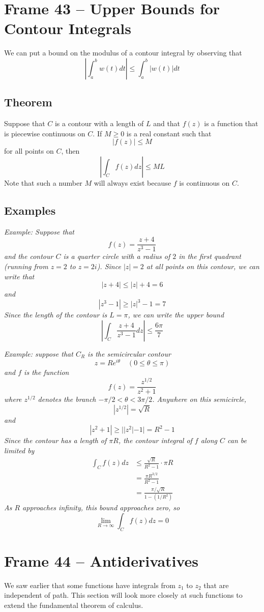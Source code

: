 \documentclass{article}
\begin{document}
\clearpage
\section{Frame 43 -- Upper Bounds for Contour Integrals}
We can put a bound on the modulus of a contour integral by observing that
\[
	\left| \int_a^b w(t) dt \right| 
	\le \int_a^b \left| w(t) \right| dt
\]

\subsection{Theorem}
Suppose that $C$ is a contour with a length of $L$ and that $f(z)$ is a function that is piecewise continuous on $C$. If $M \ge 0$ is a real constant such that
\[
	|f(z)| \le M
\]
for all points on $C$, then
\[
	\left| \int_C f(z) dz \right| \le ML
\]
Note that such a number $M$ will always exist because $f$ is continuous on $C$.

\subsection{Examples}
\textit{Example: Suppose that
\[
	f(z) = \frac{z + 4}{z^3 - 1}
\]
and the contour $C$ is a quarter circle with a radius of $2$ in the first quadrant (running from $z = 2$ to $z = 2i$). Since $|z| = 2$ at all points on this contour, we can write that
\[
	|z + 4| \le |z| + 4 = 6
\]
and
\[
	|z^3 - 1| \ge |z|^3 - 1 = 7
\]
Since the length of the contour is $L = \pi$, we can write the upper bound
\[
	\left| \int_C \frac{z + 4}{z^3 - 1} dz \right| \le \frac{6\pi}{7}
\]
}

\textit{Example: suppose that $C_R$ is the semicircular contour
\[
	z = Re^{i\theta}	\quad	(0 \le \theta \le \pi)
\]
and $f$ is the function
\[
	f(z) = \frac{z^{1/2}}{z^2 + 1}
\]
where $z^{1/2}$ denotes the branch $-\pi/2 < \theta < 3\pi/2$. Anywhere on this semicircle,
\[
	|z^{1/2}| = \sqrt{R}
\]
and
\[
	|z^2 + 1| \ge ||z^2| - 1| = R^2 - 1
\]
Since the contour has a length of $\pi R$, the contour integral of $f$ along $C$ can be limited by
\begin{align*}
	\int_C f(z) dz 
	&\le \frac{\sqrt{R}}{R^2 - 1} \cdot \pi R \\
	&= \frac{\pi R^{3/2}}{R^2 - 1} \\
	&= \frac{\pi / \sqrt{R}}{1 - (1 / R^2)}
\end{align*}
As $R$ approaches infinity, this bound approaches zero, so
\[
	\lim_{R \to \infty} \int_C f(z) dz = 0
\]}


\clearpage
\section{Frame 44 -- Antiderivatives}
We saw earlier that some functions have integrals from $z_1$ to $z_2$ that are independent of path. This section will look more closely at such functions to extend the fundamental theorem of calculus.
\end{document}
